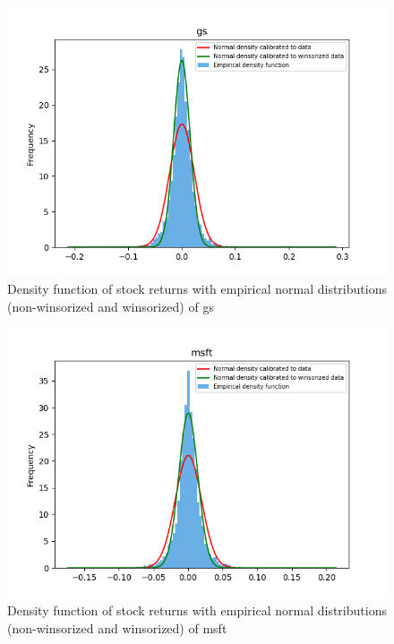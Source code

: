 \documentclass[10pt]{article}
\newenvironment{exercise}[2][Exercise]{\begin{trivlist}
  \item[\hskip \labelsep {\bfseries #1}\hskip \labelsep {\bfseries #2.}]}{\end{trivlist}}
\begin{document}
\begin{exercise}{3}
\begin{figure}[H]
		\end{figure}
		
		\begin{figure}[H]
	
			\centering
			\includegraphics[scale=0.7]{Figures/ex3_gs.png}	
			\caption{Density function of stock returns with empirical normal distributions (non-winsorized and winsorized) of gs}	
			\label{fig:ex3_gs}
	
		\end{figure}
		
		\begin{figure}[H]
	
			\centering
			\includegraphics[scale=0.7]{Figures/ex3_msft.png}	
			\caption{Density function of stock returns with empirical normal distributions (non-winsorized and winsorized) of msft}	
			\label{fig:ex3_msft}
	

\end{figure}
\end{exercise}
\end{document}
